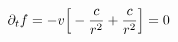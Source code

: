 \documentclass[preview]{standalone}
\begin{document}
\begin{align*}
\special{dvisvgm:raw <g id='unique000'>}\partial_t f = -v\Big[-\frac{c}{r^2} + \frac{c}{r^2}\Big] = 0\special{dvisvgm:raw </g>}
\end{align*}
\end{document}
